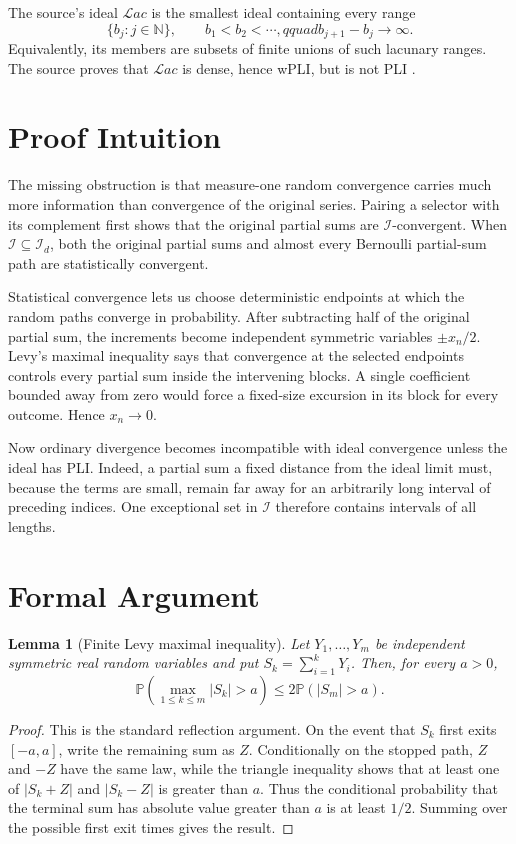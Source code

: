 \documentclass[11pt]{article}
\newtheorem{lemma}{Lemma}
\newcommand{\N}{\mathbb N}
\newcommand{\cI}{\mathcal I}
\newcommand{\Lac}{\mathcal{L}ac}
\newcommand{\Id}{\mathcal I_d}
\newcommand{\Prob}{\mathbb P}
\begin{document}
The source's ideal $\Lac$ is the smallest ideal containing every range
\[
 \{b_j:j\in\N\},\qquad b_1<b_2<\cdots,qquad b_{j+1}-b_j\longrightarrow\infty.
\]
Equivalently, its members are subsets of finite unions of such lacunary
ranges.  The source proves that $\Lac$ is dense, hence wPLI, but is not PLI
\cite[Remark 4.4(ii) and Example 3]{BPW}.

\section*{Proof Intuition}

The missing obstruction is that measure-one random convergence carries much
more information than convergence of the original series.  Pairing a selector
with its complement first shows that the original partial sums are
$\cI$-convergent.  When $\cI\subseteq\Id$, both the original partial sums and
almost every Bernoulli partial-sum path are statistically convergent.

Statistical convergence lets us choose deterministic endpoints at which the
random paths converge in probability.  After subtracting half of the original
partial sum, the increments become independent symmetric variables
$\pm x_n/2$.  Levy's maximal inequality says that convergence at the selected
endpoints controls every partial sum inside the intervening blocks.  A single
coefficient bounded away from zero would force a fixed-size excursion in its
block for every outcome.  Hence $x_n\to0$.

Now ordinary divergence becomes incompatible with ideal convergence unless
the ideal has PLI.  Indeed, a partial sum a fixed distance from the ideal limit
must, because the terms are small, remain far away for an arbitrarily long
interval of preceding indices.  One exceptional set in $\cI$ therefore
contains intervals of all lengths.

\section*{Formal Argument}

\begin{lemma}[Finite Levy maximal inequality]
\label{lem:levy}
Let $Y_1,\dots,Y_m$ be independent symmetric real random variables and put
$S_k=\sum_{i=1}^kY_i$.  Then, for every $a>0$,
\[
 \Prob\!\left(\max_{1\leq k\leq m}|S_k|>a\right)
 \leq 2\Prob(|S_m|>a).
\]
\end{lemma}

\begin{proof}
This is the standard reflection argument.  On the event that $S_k$ first
exits $[-a,a]$, write the remaining sum as $Z$.  Conditionally on the stopped
path, $Z$ and $-Z$ have the same law, while the triangle inequality shows
that at least one of $|S_k+Z|$ and $|S_k-Z|$ is greater than $a$.  Thus the
conditional probability that the terminal sum has absolute value greater
than $a$ is at least $1/2$.  Summing over the possible first exit times gives
the result.
\end{proof}
\end{document}
